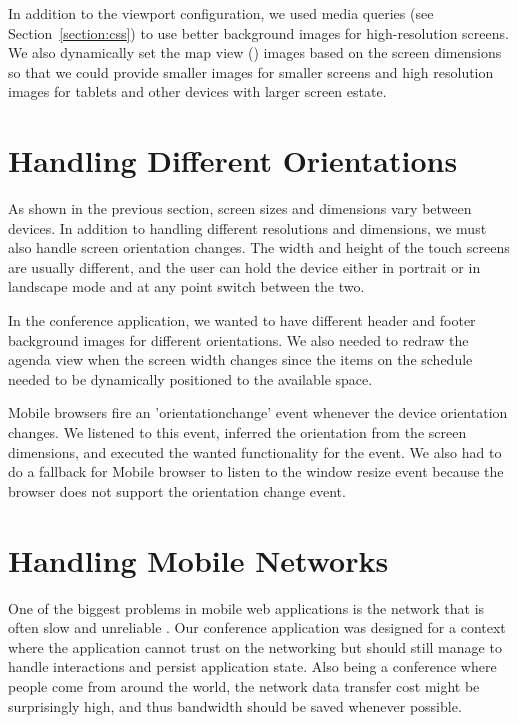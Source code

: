 In addition to the viewport configuration, we used media queries (see
Section~\ref{section:css}) to use better background images for
high-resolution screens. We also dynamically set the map view
() images based on the screen dimensions so
that we could provide smaller images for smaller screens and high
resolution images for tablets and other devices with larger screen
estate.

\section{Handling Different Orientations}

As shown in the previous section, screen sizes and dimensions vary
between devices. In addition to handling different resolutions and
dimensions, we must also handle screen orientation changes. The width
and height of the touch screens are usually different, and the user
can hold the device either in portrait or in landscape mode and at any
point switch between the two.

In the conference application, we wanted to have different header and
footer background images for different orientations. We also needed to
redraw the agenda view when the screen width changes since the items
on the schedule needed to be dynamically positioned to the available
space.

Mobile browsers fire an 'orientationchange' event whenever the device
orientation changes. We listened to this event, inferred the
orientation from the screen dimensions, and executed the wanted
functionality for the event. We also had to do a fallback for Mobile
 browser to listen to the window resize event because the
browser does not support the orientation change event.

\section{Handling Mobile Networks}
\label{section:handling-networks}

One of the biggest problems in mobile web applications is the network
that is often slow and unreliable \citationneeded. Our conference
application was designed for a context where the application cannot
trust on the networking but should still manage to handle interactions
and persist application state. Also being a conference where people
come from around the world, the network data transfer cost might be
surprisingly high, and thus bandwidth should be saved whenever
possible.

